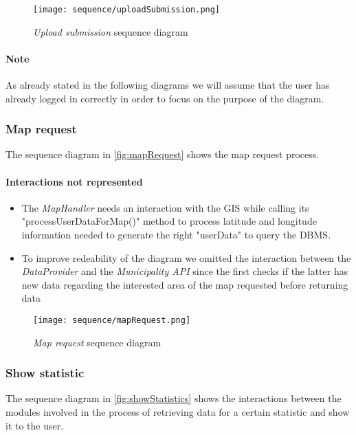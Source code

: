 	\begin{figure}[h!]
		\centering
		\texttt{[image: sequence/uploadSubmission.png]}
		\caption{
			\label{fig:uploadSubmission} 
			\emph{Upload submission} sequence diagram
		}
	\end{figure}
	\clearpage

\paragraph{Note} As already stated in the following diagrams we will assume that the user has already logged in correctly
	in order to focus on the purpose of the diagram.\\

\subsubsection{Map request}
The sequence diagram in \autoref{fig:mapRequest} shows the map request process.\\

\paragraph{Interactions not represented}
\begin{itemize}
\item The \emph{MapHandler} needs an interaction with the GIS while calling its "processUserDataForMap()" method	
	to process latitude and longitude information needed to generate the right "userData" to query the DBMS. 
\item To improve redeability of the diagram we omitted the interaction between the \emph{DataProvider} and the 
	\emph{Municipality API} since the first checks if the latter has new data regarding the interested area of the 
	map requested before returning data
\end{itemize}

\begin{figure}[h!]  
	\centering
	\texttt{[image: sequence/mapRequest.png]}
	\caption{
		\label{fig:mapRequest} 
		\emph{Map request} sequence diagram
	}
\end{figure}

\clearpage
\subsubsection{Show statistic}
The sequence diagram in \autoref{fig:showStatistics} shows the interactions between the modules involved in the process of retrieving data
for a certain statistic and show it to the user.\\

